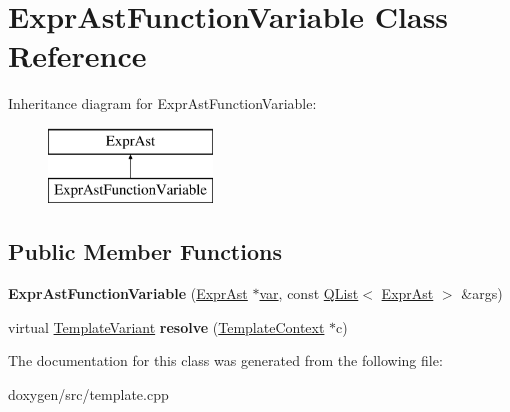\hypertarget{class_expr_ast_function_variable}{}\section{Expr\+Ast\+Function\+Variable Class Reference}
\label{class_expr_ast_function_variable}
Inheritance diagram for Expr\+Ast\+Function\+Variable\+:\begin{figure}[H]
\begin{center}
\leavevmode
\includegraphics[height=2.000000cm]{class_expr_ast_function_variable}
\end{center}
\end{figure}
\subsection*{Public Member Functions}
\begin{DoxyCompactItemize}
\item 
\mbox{\label{class_expr_ast_function_variable_a984114e518d5788a170e9587b906a6f0}} 
{\bfseries Expr\+Ast\+Function\+Variable} (\mbox{\hyperlink{class_expr_ast}{Expr\+Ast}} $\ast$\mbox{\hyperlink{018__def_8c_a335628f2e9085305224b4f9cc6e95ed5}{var}}, const \mbox{\hyperlink{class_q_list}{Q\+List}}$<$ \mbox{\hyperlink{class_expr_ast}{Expr\+Ast}} $>$ \&args)
\item 
\mbox{\label{class_expr_ast_function_variable_ace4983a38dfa752f34e2fd23b3bb9eb5}} 
virtual \mbox{\hyperlink{class_template_variant}{Template\+Variant}} {\bfseries resolve} (\mbox{\hyperlink{class_template_context}{Template\+Context}} $\ast$c)
\end{DoxyCompactItemize}


The documentation for this class was generated from the following file\+:\begin{DoxyCompactItemize}
\item 
doxygen/src/template.\+cpp\end{DoxyCompactItemize}
